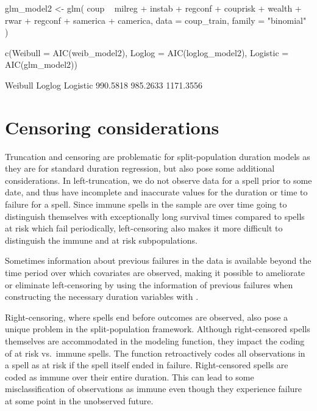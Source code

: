 \documentclass[article]{jss}
\begin{document}
\begin{CodeChunk}
\begin{CodeInput}
glm_model2    <- glm(
  coup ~ milreg + instab + regconf + couprisk + wealth + rwar + regconf + 
    samerica + camerica,
  data = coup_train, family = "binomial"
)

c(Weibull = AIC(weib_model2), 
  Loglog = AIC(loglog_model2), 
  Logistic = AIC(glm_model2))
\end{CodeInput}
\begin{CodeOutput}
  Weibull    Loglog  Logistic 
 990.5818  985.2633 1171.3556 
\end{CodeOutput}
\end{CodeChunk}

\section{Censoring considerations}

Truncation and censoring are problematic for split-population duration
models as they are for standard duration regression, but also pose some
additional considerations. In left-truncation, we do not observe data
for a spell prior to some date, and thus have incomplete and inaccurate
values for the duration or time to failure for a spell. Since immune
spells in the sample are over time going to distinguish themselves with
exceptionally long survival times compared to spells at risk which fail
periodically, left-censoring also makes it more difficult to distinguish
the immune and at risk subpopulations.

Sometimes information about previous failures in the data is available
beyond the time period over which covariates are observed, making it
possible to ameliorate or eliminate left-censoring by using the
information of previous failures when constructing the necessary
duration variables with .

Right-censoring, where spells end before outcomes are observed, also
pose a unique problem in the split-population framework. Although
right-censored spells themselves are accommodated in the modeling
function, they impact the coding of at risk vs.~immune spells. The
 function retroactively codes all observations in
a spell as at risk if the spell itself ended in failure. Right-censored
spells are coded as immune over their entire duration. This can lead to
some misclassification of observations as immune even though they
experience failure at some point in the unobserved future.
\end{document}
